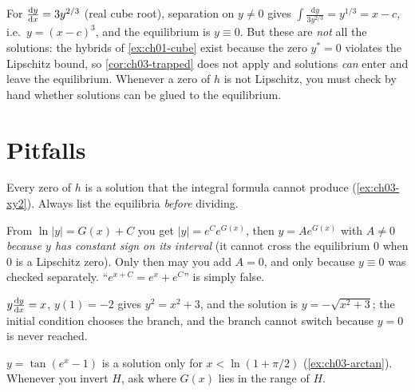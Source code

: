 \begin{example}\label{ex:ch03-cube-again}
For $\frac{\mathrm{d}y}{\mathrm{d}x} = 3y^{2/3}$ (real cube root), separation on $y\neq0$ gives
$\int\frac{\mathrm{d}y}{3y^{2/3}} = y^{1/3} = x - c$, i.e.\ $y = (x-c)^3$, and the
equilibrium is $y\equiv 0$. But these are \emph{not} all the solutions: the
hybrids of \cref{ex:ch01-cube} exist because the zero $y^* = 0$ violates the
Lipschitz bound, so \cref{cor:ch03-trapped} does not apply and solutions
\emph{can} enter and leave the equilibrium. Whenever a zero of $h$ is not
Lipschitz, you must check by hand whether solutions can be glued to the
equilibrium.
\end{example}

\section{Pitfalls}\label{sec:ch03-pitfalls}

\begin{pitfall}\label{pit:ch03-equilibria}
Every zero of $h$ is a solution that the integral formula cannot produce
(\cref{ex:ch03-xy2}). Always list the equilibria \emph{before} dividing.
\end{pitfall}

\begin{pitfall}[Mishandling $\pm e^{C}$]\label{pit:ch03-plusminus}
From $\ln|y| = G(x) + C$ you get $|y| = e^Ce^{G(x)}$, then $y = Ae^{G(x)}$ with
$A\neq0$ \emph{because $y$ has constant sign on its interval} (it cannot cross
the equilibrium $0$ when $0$ is a Lipschitz zero). Only then may you add $A=0$,
and only because $y\equiv0$ was checked separately. ``$e^{x+C} = e^x + e^C$'' is
simply false.
\end{pitfall}

\begin{pitfall}\label{pit:ch03-branch}
$y\frac{\mathrm{d}y}{\mathrm{d}x} = x$, $y(1) = -2$ gives $y^2 = x^2 + 3$, and the solution is
$y = -\sqrt{x^2+3}$; the initial condition chooses the branch, and the branch
cannot switch because $y = 0$ is never reached.
\end{pitfall}

\begin{pitfall}\label{pit:ch03-interval}
$y = \tan(e^x - 1)$ is a solution only for $x<\ln(1+\pi/2)$
(\cref{ex:ch03-arctan}). Whenever you invert $H$, ask where $G(x)$ lies in the
range of $H$.
\end{pitfall}

